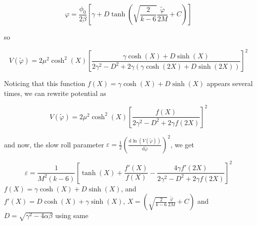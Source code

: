 \documentclass{article}
\begin{document}
\begin{equation}
    \varphi = \frac{\phi_0}{2 \beta} \left[ \gamma + D\tanh \left( \sqrt{\frac{2}{k-6}} \frac{\tilde{\varphi}}{2M} + C \right) \right]
\end{equation}

so

\begin{equation}
    V(\tilde{\varphi}) =  2\mu^2 \cosh^2(X)  \left [ \frac{\gamma \cosh(X)  + D \sinh(X) }{2\gamma^2 - D^2 + 2\gamma(\gamma \cosh(2X)  + D \sinh(2X))} \right]^2
\end{equation}

Noticing that this function $f(X) = \gamma \cosh(X)  + D \sinh(X)$ appears several times, we can rewrite potential as 

\begin{equation}
    V(\tilde{\varphi}) =  2\mu^2 \cosh^2(X)  \left [ \frac{f(X) }{2\gamma^2 - D^2 + 2\gamma f(2X)} \right]^2
\end{equation}

and now, the slow roll parameter $\varepsilon = \frac{1}{2} (\frac{\text{d}\ln(V(\tilde{\varphi}))}{\text{d}\tilde{\varphi}})^2$, we get

\begin{equation}
    \varepsilon = \frac{1}{M^2 (k-6)} \left[ \tanh(X) + \frac{f'(X)}{f(X)} - \frac{4\gamma f'(2X)}{2\gamma^2 - D^2 + 2\gamma f(2X)} \right]^2
\end{equation}
$f(X) = \gamma \cosh(X)  + D \sinh(X)$, and $f'(X) = D \cosh(X)  + \gamma \sinh(X)$, $X = \left( \sqrt{\frac{2}{k-6}} \frac{\tilde{\varphi}}{2M} + C \right)$ and $D = \sqrt{\gamma^2-4\alpha\beta}$
using same 

\end{document}
